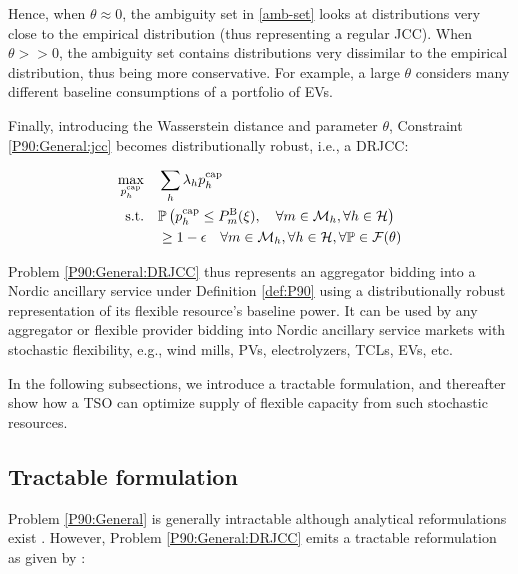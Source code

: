 \documentclass[conference]{IEEEtran}
\begin{document}
Hence, when $\theta \approx 0$, the ambiguity set in \eqref{amb-set} looks at distributions very close to the empirical distribution (thus representing a regular \ac{JCC}). When $\theta >> 0$, the ambiguity set contains distributions very dissimilar to the empirical distribution, thus being more conservative. For example, a large $\theta$ considers many different baseline consumptions of a portfolio of \acp{EV}.

Finally, introducing the Wasserstein distance and parameter $\theta$, Constraint \eqref{P90:General:jcc} becomes distributionally robust, i.e., a \ac{DRJCC}:

\begin{subequations}\label{P90:General:DRJCC}
    \begin{align}
        \max_{p_{h}^{\text{cap}}} \quad & \sum_h \lambda_h p_{h}^{\text{cap}}                                                                                                                                                                                                     \\
        \text{s.t.} \quad               & \mathbb{P}  \left( p_{h}^{\text{cap}} \leq P_{m}^{\text{B}}(\xi), \quad \forall{m} \in \mathcal{M}_{h},  \forall{h} \in \mathcal{H}  \right) \notag  \\
        & \geq 1 - \epsilon \quad \forall{m} \in \mathcal{M}_{h},  \forall{h} \in \mathcal{H}, \forall{\mathbb{P}} \in \mathcal{F}(\theta) \label{P90:General:drjcc_c}
    \end{align}
\end{subequations}

Problem \eqref{P90:General:DRJCC} thus represents an aggregator bidding into a Nordic ancillary service under Definition \ref{def:P90} using a distributionally robust representation of its flexible resource's baseline power. It can be used by any aggregator or flexible provider bidding into Nordic ancillary service markets with stochastic flexibility, e.g., wind mills, \acp{PV}, electrolyzers, \acp{TCL}, \acp{EV}, etc.

In the following subsections, we introduce a tractable formulation, and thereafter show how a \ac{TSO} can optimize supply of flexible capacity from such stochastic resources.


\subsection{Tractable formulation}

Problem \eqref{P90:General} is generally intractable although analytical reformulations exist \cite{nemirovski2007convex}. However, Problem \eqref{P90:General:DRJCC} emits a tractable reformulation as given by \cite[Proposition 2]{chen2022data}:
\end{document}
